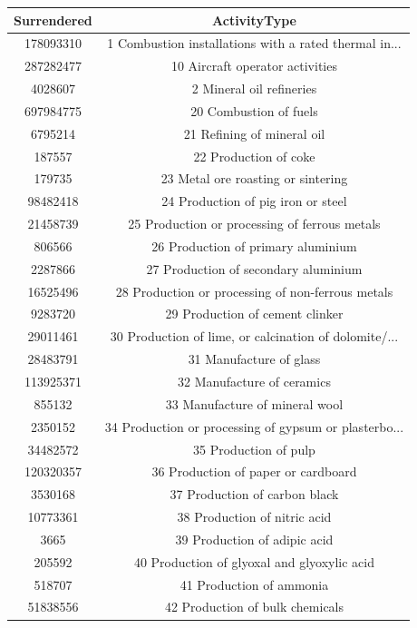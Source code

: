 \documentclass[a4paper,twoside,10pt]{article}
\begin{document}
\begin{tabular}{|c|c|}
	\hline
	Surrendered & ActivityType \\
	\hline
	178093310 & 1 Combustion installations with a rated thermal in... \\
	\hline
	287282477 & 10 Aircraft operator activities \\
	\hline
	4028607 & 2 Mineral oil refineries \\
	\hline
	697984775 & 20 Combustion of fuels \\
	\hline
	6795214 & 21 Refining of mineral oil \\
	\hline
	187557 & 22 Production of coke \\
	\hline
	179735 & 23 Metal ore roasting or sintering \\
	\hline
	98482418 & 24 Production of pig iron or steel \\
	\hline
	21458739 & 25 Production or processing of ferrous metals \\
	\hline
	806566 & 26 Production of primary aluminium \\
	\hline
	2287866 & 27 Production of secondary aluminium \\
	\hline
	16525496 & 28 Production or processing of non-ferrous metals \\
	\hline
	9283720 & 29 Production of cement clinker \\
	\hline
	29011461 & 30 Production of lime, or calcination of dolomite/... \\
	\hline
	28483791 & 31 Manufacture of glass \\
	\hline
	113925371 & 32 Manufacture of ceramics \\
	\hline
	855132 & 33 Manufacture of mineral wool \\
	\hline
	2350152 & 34 Production or processing of gypsum or plasterbo... \\
	\hline
	34482572 & 35 Production of pulp \\
	\hline
	120320357 & 36 Production of paper or cardboard \\
	\hline
	3530168 & 37 Production of carbon black \\
	\hline
	10773361 & 38 Production of nitric acid \\
	\hline
	3665 & 39 Production of adipic acid \\
	\hline
	205592 & 40 Production of glyoxal and glyoxylic acid \\
	\hline
	518707 & 41 Production of ammonia \\
	\hline
	51838556 & 42 Production of bulk chemicals \\

\end{tabular}
\end{document}

